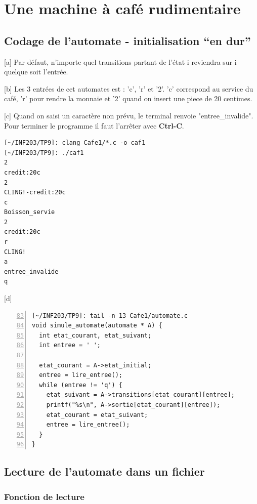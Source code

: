 \documentclass[12pt,a4paper,notitlepage,colorinlistoftodos]{article}
\begin{document}

\section{Une machine à café rudimentaire}

\subsection{Codage de l’automate - initialisation “en dur”}

[a]
Par défaut, n'importe quel transitions partant de l'état i reviendra sur i quelque soit l'entrée.


[b]
Les 3 entrées de cet automates est : 'c', 'r' et '2'.
'c' correspond au service du café, 'r' pour rendre la monnaie et '2' quand on insert une piece de 20 centimes.


[c]
Quand on saisi un caractère non prévu, le terminal renvoie "entree\_invalide".
Pour terminer le programme il faut l'arrêter avec \textbf{Ctrl-C}.

\begin{lstlisting}[language = rshell]
[~/INF203/TP9]: clang Cafe1/*.c -o caf1
[~/INF203/TP9]: ./caf1 
2
credit:20c
2
CLING!-credit:20c
c
Boisson_servie
2
credit:20c
r
CLING! 
a
entree_invalide 
q
\end{lstlisting}


[d]
\begin{lstlisting}[numbers=left, firstnumber = 83 ]
[~/INF203/TP9]: tail -n 13 Cafe1/automate.c
void simule_automate(automate * A) {
  int etat_courant, etat_suivant;
  int entree = ' ';

  etat_courant = A->etat_initial;
  entree = lire_entree();
  while (entree != 'q') {
    etat_suivant = A->transitions[etat_courant][entree];
    printf("%s\n", A->sortie[etat_courant][entree]);
    etat_courant = etat_suivant;
    entree = lire_entree();
  }
}
\end{lstlisting}


\subsection{Lecture de l’automate dans un fichier}


\subsubsection{Fonction de lecture}
\end{document}
